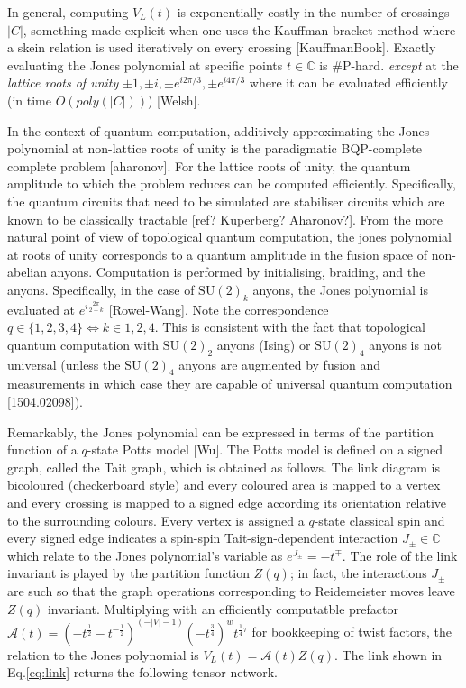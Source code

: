 In general, computing $V_L(t)$
is exponentially costly in the number of crossings $|C|$,
something made explicit when one uses the Kauffman bracket method where a skein relation is used iteratively on every crossing [KauffmanBook].
Exactly evaluating the Jones polynomial at specific points $t\in\mathbb{C}$ is \#P-hard.
\emph{except} at the \emph{lattice roots of unity} $\pm 1, \pm i, \pm e^{i 2\pi/3}, \pm e^{i 4\pi/3}$ where it can be evaluated efficiently (in time $O(poly(|C|))$) [Welsh].


In the context of quantum computation,
additively approximating the Jones polynomial at non-lattice roots of unity is the paradigmatic BQP-complete complete problem [aharonov].
For the lattice roots of unity, the quantum amplitude to which the problem reduces can be computed efficiently.
Specifically, the quantum circuits that need to be simulated are stabiliser circuits which are known to be classically tractable [ref? Kuperberg? Aharonov?].
From the more natural point of view of topological quantum computation,
the jones polynomial at roots of unity corresponds to a quantum amplitude in the fusion space of non-abelian anyons.
Computation is performed by initialising, braiding, and the anyons.
Specifically, in the case of $\text{SU}(2)_k$ anyons, the Jones polynomial is evaluated at $e^{i\frac{2\pi}{2+k}}$ [Rowel-Wang]. Note the correspondence $q\in\{1,2,3,4\}\Leftrightarrow k\in{1,2,4}$.
This is consistent with the fact that topological quantum computation with $\text{SU}(2)_2$ anyons (Ising) or $\text{SU}(2)_4$ anyons is not universal (unless the $\text{SU}(2)_4$ anyons are augmented by fusion and measurements in which case they are capable of universal quantum computation [1504.02098]).



Remarkably, the Jones polynomial can be expressed in terms of the partition function of a $q$-state Potts model [Wu].
The Potts model is defined on a signed graph, called the Tait graph, which is obtained as follows.
The link diagram is bicoloured (checkerboard style)
and every coloured area is mapped to a vertex and every crossing is mapped to a signed edge according
its orientation relative to the surrounding colours.
Every vertex is assigned a $q$-state classical spin
and every signed edge indicates a spin-spin Tait-sign-dependent interaction $J_\pm\in\mathbb{C}$ which relate to the Jones polynomial's variable as $e^{J_\pm}=-t^\mp$.
The role of the link invariant is played by the partition function $Z(q)$;
in fact, the interactions $J_\pm$ are such so that the graph operations corresponding to Reidemeister moves leave $Z(q)$ invariant.
Multiplying with an efficiently computatble prefactor $\mathcal{A}(t) = (-t^\frac{1}{2}-t^{-\frac{1}{2}})^{(-|V|-1)} (-t^\frac{3}{4})^w t^{\frac{1}{4}\tau}$ for bookkeeping of twist factors, the relation to the Jones polynomial is
$V_L(t) = \mathcal{A}(t) Z(q)$.
The link shown in Eq.\ref{eq:link} returns the following tensor network.



